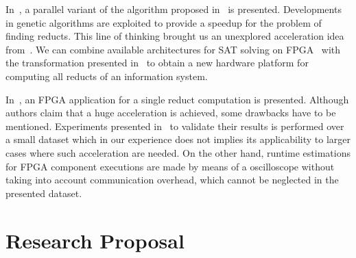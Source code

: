 \documentclass[authoryear,11pt]{elsarticle}
\begin{document}
  In~\citep{Wroblewski98}, a parallel variant of the algorithm proposed in~\citep{Wroblewski95} is presented.
  Developments in genetic algorithms are exploited to provide a speedup for the problem of finding reducts.
  This line of thinking brought us an unexplored acceleration idea from~\citep{Jensen14}. We can combine 
  available architectures for SAT solving on FPGA~\citep{Safar07,Kanazawa11} with the transformation
  presented in~\citep{Jensen14} to obtain a new hardware platform for computing all reducts of an information 
  system.
  
  In~\citep{Grzes13,Kopczynski14}, an FPGA application for a single reduct computation is presented. Although
  authors claim that a huge acceleration is achieved, some drawbacks have to be mentioned. Experiments presented 
  in~\citep{Kopczynski14} to validate their results is performed over a small dataset which in our experience 
  does not implies its applicability to larger cases where such acceleration are needed. On the other hand, 
  runtime estimations for FPGA component executions are made by means of a oscilloscope without taking into 
  account communication overhead, which cannot be neglected in the presented dataset.
  
\section{Research Proposal}\label{ResearchProposal} 
\end{document}
